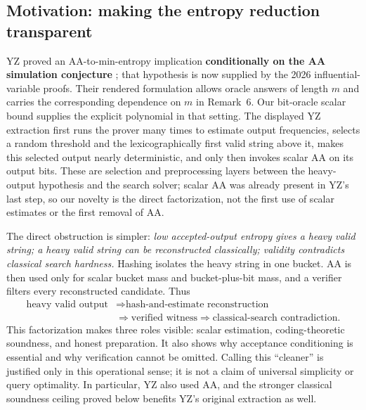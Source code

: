 \documentclass[11pt]{article}
\theoremstyle{definition}\newtheorem{definition}[theorem]{Definition}
\theoremstyle{remark}\newtheorem{remark}[theorem]{Remark}
\begin{document}
\subsection{Motivation: making the entropy reduction transparent}
YZ proved an AA-to-min-entropy implication \textbf{conditionally on the AA simulation conjecture} \cite[Conjecture~8.1 and Theorem~8.4]{YZ24}; that hypothesis is now supplied by the 2026 influential-variable proofs. Their rendered formulation allows oracle answers of length \(m\) and carries the corresponding dependence on \(m\) in Remark~6. Our bit-oracle scalar bound supplies the explicit polynomial in that setting. The displayed YZ extraction first runs the prover many times to estimate output frequencies, selects a random threshold and the lexicographically first valid string above it, makes this selected output nearly deterministic, and only then invokes scalar AA on its output bits. These are selection and preprocessing layers between the heavy-output hypothesis and the search solver; scalar AA was already present in YZ's last step, so our novelty is the direct factorization, not the first use of scalar estimates or the first removal of AA.

The direct obstruction is simpler: \emph{low accepted-output entropy gives a heavy valid string; a heavy valid string can be reconstructed classically; validity contradicts classical search hardness.} Hashing isolates the heavy string in one bucket. AA is then used only for scalar bucket mass and bucket-plus-bit mass, and a verifier filters every reconstructed candidate. Thus
\begin{align*}
 \text{heavy valid output}&\Longrightarrow\text{hash-and-estimate reconstruction}\\
 &\Longrightarrow\text{verified witness}\Longrightarrow\text{classical-search contradiction.}
\end{align*}
This factorization makes three roles visible: scalar estimation, coding-theoretic soundness, and honest preparation. It also shows why acceptance conditioning is essential and why verification cannot be omitted. Calling this ``cleaner'' is justified only in this operational sense; it is not a claim of universal simplicity or query optimality. In particular, YZ also used AA, and the stronger classical soundness ceiling proved below benefits YZ's original extraction as well.
\end{document}
